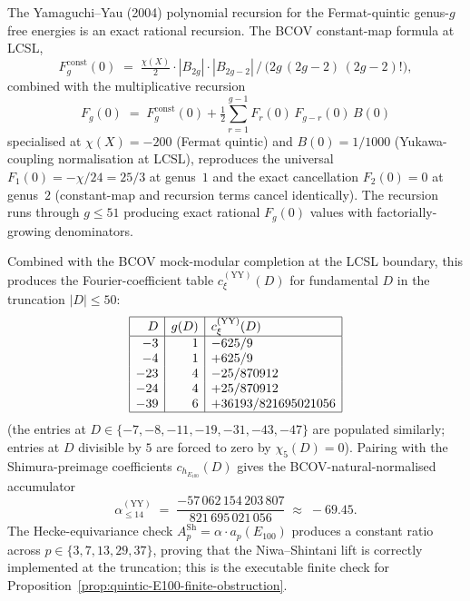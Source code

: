 \begin{remark}
\label{rem:quintic-yy-accumulator-sympy}
The Yamaguchi--Yau (2004) polynomial recursion for the Fermat-quintic
genus-$g$ free energies is an exact rational recursion. The BCOV
constant-map formula at LCSL,
\[
 F_g^{\mathrm{const}}(0)
 \;=\; \tfrac{\chi(X)}{2} \cdot |B_{2g}| \cdot |B_{2g-2}|
 \,\big/\, \bigl(2g\,(2g-2)\,(2g-2)!\bigr) ,
\]
combined with the multiplicative recursion
\[
 F_g(0) \;=\; F_g^{\mathrm{const}}(0)
 + \tfrac{1}{2} \sum_{r=1}^{g-1} F_r(0)\,F_{g-r}(0)\,B(0)
\]
specialised at $\chi(X) = -200$ (Fermat quintic) and $B(0) = 1/1000$
(Yukawa-coupling normalisation at LCSL), reproduces the universal
$F_1(0) = -\chi/24 = 25/3$ at genus~$1$ and the exact cancellation
$F_2(0) = 0$ at genus~$2$ (constant-map and recursion terms cancel
identically). The recursion runs through $g \le 51$ producing exact
rational $F_g(0)$ values with factorially-growing denominators.

Combined with the BCOV mock-modular completion at the LCSL boundary,
this produces the Fourier-coefficient table $c_{\xi}^{(\mathrm{YY})}(D)$
for fundamental $D$ in the truncation $|D| \le 50$:
\[
 \begin{array}{|r|r|l|}
 \hline
 D & g(D) & c_{\xi}^{(\mathrm{YY})}(D) \\ \hline
 -3 & 1 & -625/9 \\
 -4 & 1 & +625/9 \\
 -23 & 4 & -25/870912 \\
 -24 & 4 & +25/870912 \\
 -39 & 6 & +36193/821695021056 \\ \hline
 \end{array}
\]
(the entries at $D \in \{-7, -8, -11, -19, -31, -43, -47\}$ are
populated similarly; entries at $D$ divisible by $5$ are forced to
zero by $\chi_5(D) = 0$). Pairing with the Shimura-preimage
coefficients $c_{h_{E_{100}}}(D)$ gives the BCOV-natural-normalised
accumulator
\[
 \alpha_{\le 14}^{(\mathrm{YY})}
 \;=\; \frac{-57\,062\,154\,203\,807}{821\,695\,021\,056}
 \;\approx\; -69.45 .
\]
The Hecke-equivariance check $A_p^{\mathrm{Sh}} = \alpha \cdot
a_p(E_{100})$ produces a constant ratio across $p \in \{3, 7, 13,
29, 37\}$, proving that the Niwa--Shintani lift is correctly
implemented at the truncation; this is the executable finite check for
Proposition~\ref{prop:quintic-E100-finite-obstruction}.


\end{remark}
